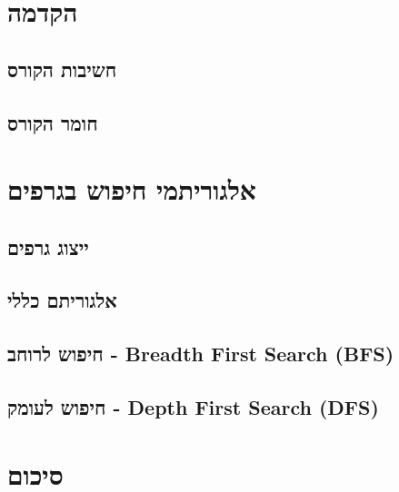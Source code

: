 \section*{הקדמה}

	\subsection*{חשיבות הקורס}
	
	\subsection*{חומר הקורס}
	
\section*{אלגוריתמי חיפוש בגרפים}
	
	\subsection*{ייצוג גרפים}
	
	\subsection*{אלגוריתם כללי}
	
	\subsection*{חיפוש לרוחב - \textenglish{Breadth First Search (BFS)}}
	
	\subsection*{חיפוש לעומק - \textenglish{Depth First Search (DFS)}}
	
\section*{סיכום}

